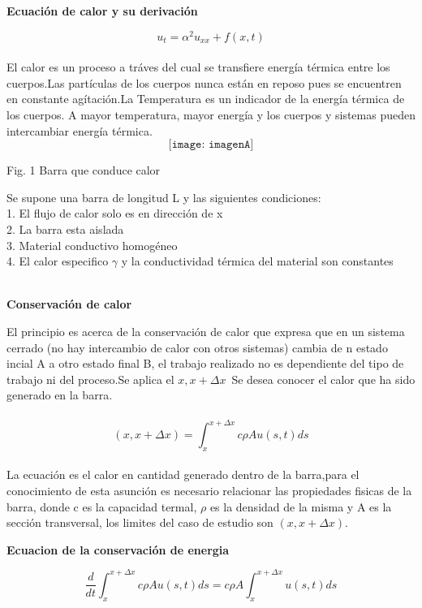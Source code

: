 \documentclass[10pt,a4paper]{report}
\begin{document}
\newpage
\Large 
\begin{center}
\textbf{Ecuación de calor y su derivación}
\end{center}
$$\displaystyle u_t=\alpha^2 u_{xx} + f(x,t)$$
\\El calor es un proceso a tráves del cual se transfiere energía térmica entre los cuerpos.Las partículas de los cuerpos nunca están en reposo pues se encuentren en constante agítación.La Temperatura es un indicador de la energía térmica de los cuerpos. A mayor temperatura, mayor energía y los cuerpos y sistemas pueden intercambiar energía térmica.
\\$$\texttt{[image: imagenA]}$$
\begin{center}
\small {Fig. 1 Barra que conduce calor}
\end{center}
Se supone una barra de longitud L y las siguientes condiciones:
\\ 1. El flujo de calor solo es en dirección de x
\\ 2. La barra esta aislada
\\ 3. Material conductivo homogéneo
\\ 4. El calor especifico $\gamma$ y la conductividad térmica del material son constantes
\\\\ \Large  
\begin{center}
\textbf {Conservación de calor}
\end{center} 
El principio es acerca de la conservación de calor que expresa que en un sistema cerrado (no hay intercambio de calor con otros sistemas) cambia de n estado incial A a otro estado final B, el trabajo realizado no es dependiente del tipo de trabajo ni del proceso.Se aplica el $x , x+\Delta x \,$ Se desea conocer el calor que ha sido generado en la barra.
\\\\ $$\displaystyle (x,x+ \Delta x) = \int_x^{x+ \Delta x} c \rho A u (s,t) ds $$
\\  La ecuación es el calor en cantidad generado dentro de la barra,para el conocimiento de esta asunción es necesario relacionar las propiedades fisicas de la barra, donde c es la capacidad termal, $\rho$ es la densidad de la misma y A es la sección transversal, los limites del caso de estudio son $(x, x+\Delta x)$.
\newpage
\Large 
\begin{center}
\textbf {Ecuacion de la conservación de energia}
\end{center}
$$\displaystyle \frac{d}{dt} \int_x^{x+\Delta x} c\rho Au(s,t)ds = c\rho A \int_x^{x+\Delta x} u(s,t)ds$$
\end{document}
